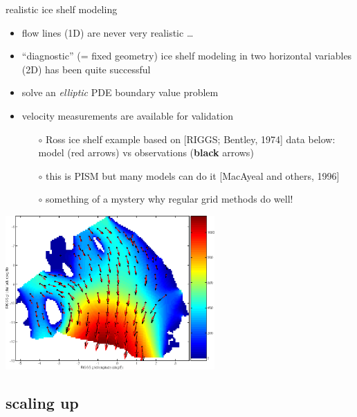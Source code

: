 \begin{frame}{realistic ice shelf modeling}

\small
\begin{itemize}
\item flow lines (1D) are never very realistic \dots
\item ``diagnostic'' (= fixed geometry) ice shelf modeling in two horizontal variables (2D) has been quite successful
\item solve an \emph{elliptic} PDE boundary value problem
\item velocity measurements are available for validation
  \begin{itemize}
  \scriptsize
  \item[$\circ$] Ross ice shelf example based on [RIGGS; Bentley, 1974]\nocite{RIGGS1} data below: model (\alert{red} arrows) vs observations (\textbf{black} arrows)
  \item[$\circ$] this is PISM but many models can do it [MacAyeal and others, 1996]\nocite{MacAyealetal}
  \item[$\circ$] something of a mystery why regular grid methods do well!
  \small
  \end{itemize}
\end{itemize}

\begin{center}
  \includegraphics[width=0.6\textwidth]{photos/PISM_ross_speeds}
\end{center}
\end{frame}


\subsection{scaling up}

